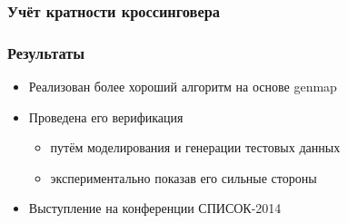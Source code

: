 \documentclass{beamer}
\begin{document}
\begin{frame}
  \frametitle{Учёт кратности кроссинговера}

\end{frame}

\begin{frame}
  \frametitle{Результаты}
  \begin{itemize}
  \item Реализован более хороший алгоритм на основе genmap
  \item Проведена его верификация
    \begin{itemize}
    \item путём моделирования и генерации тестовых данных
    \item экспериментально показав его сильные стороны
    \end{itemize}
  \item Выступление на конференции СПИСОК-2014
  \end{itemize}
\end{frame}
\end{document}
